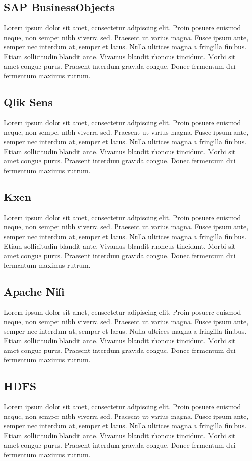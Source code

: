 \subsection{SAP BusinessObjects} 
\label{app:businessobjects}
Lorem ipsum dolor sit amet, consectetur adipiscing elit. Proin posuere euismod neque, non semper nibh viverra sed. Praesent ut varius magna. Fusce ipsum ante, semper nec interdum at, semper et lacus. Nulla ultrices magna a fringilla finibus. Etiam sollicitudin blandit ante. Vivamus blandit rhoncus tincidunt. Morbi sit amet congue purus. Praesent interdum gravida congue. Donec fermentum dui fermentum maximus rutrum.
\subsection{Qlik Sens} 
\label{app:qlik}
Lorem ipsum dolor sit amet, consectetur adipiscing elit. Proin posuere euismod neque, non semper nibh viverra sed. Praesent ut varius magna. Fusce ipsum ante, semper nec interdum at, semper et lacus. Nulla ultrices magna a fringilla finibus. Etiam sollicitudin blandit ante. Vivamus blandit rhoncus tincidunt. Morbi sit amet congue purus. Praesent interdum gravida congue. Donec fermentum dui fermentum maximus rutrum.
\subsection{Kxen} 
\label{app:kxen}
Lorem ipsum dolor sit amet, consectetur adipiscing elit. Proin posuere euismod neque, non semper nibh viverra sed. Praesent ut varius magna. Fusce ipsum ante, semper nec interdum at, semper et lacus. Nulla ultrices magna a fringilla finibus. Etiam sollicitudin blandit ante. Vivamus blandit rhoncus tincidunt. Morbi sit amet congue purus. Praesent interdum gravida congue. Donec fermentum dui fermentum maximus rutrum.
\subsection{Apache Nifi} 
\label{app:nifi}
Lorem ipsum dolor sit amet, consectetur adipiscing elit. Proin posuere euismod neque, non semper nibh viverra sed. Praesent ut varius magna. Fusce ipsum ante, semper nec interdum at, semper et lacus. Nulla ultrices magna a fringilla finibus. Etiam sollicitudin blandit ante. Vivamus blandit rhoncus tincidunt. Morbi sit amet congue purus. Praesent interdum gravida congue. Donec fermentum dui fermentum maximus rutrum.
\subsection{HDFS} 
\label{app:hdfs}
Lorem ipsum dolor sit amet, consectetur adipiscing elit. Proin posuere euismod neque, non semper nibh viverra sed. Praesent ut varius magna. Fusce ipsum ante, semper nec interdum at, semper et lacus. Nulla ultrices magna a fringilla finibus. Etiam sollicitudin blandit ante. Vivamus blandit rhoncus tincidunt. Morbi sit amet congue purus. Praesent interdum gravida congue. Donec fermentum dui fermentum maximus rutrum.
